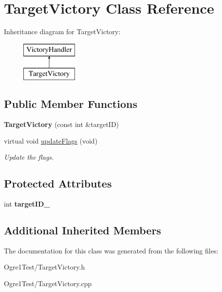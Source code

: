 \hypertarget{class_target_victory}{}\section{Target\+Victory Class Reference}
\label{class_target_victory}
Inheritance diagram for Target\+Victory\+:\begin{figure}[H]
\begin{center}
\leavevmode
\includegraphics[height=2.000000cm]{class_target_victory}
\end{center}
\end{figure}
\subsection*{Public Member Functions}
\begin{DoxyCompactItemize}
\item 
{\bfseries Target\+Victory} (const int \&target\+ID)\hypertarget{class_target_victory_a649c1ee1de19cbea7bd56e64e6c47124}{}\label{class_target_victory_a649c1ee1de19cbea7bd56e64e6c47124}

\item 
virtual void \hyperlink{class_target_victory_a5c497ae3a6a46591b3ef4d13f9d30659}{update\+Flags} (void)\hypertarget{class_target_victory_a5c497ae3a6a46591b3ef4d13f9d30659}{}\label{class_target_victory_a5c497ae3a6a46591b3ef4d13f9d30659}

\begin{DoxyCompactList}\small\item\em Update the flags. \end{DoxyCompactList}\end{DoxyCompactItemize}
\subsection*{Protected Attributes}
\begin{DoxyCompactItemize}
\item 
int {\bfseries target\+I\+D\+\_\+}\hypertarget{class_target_victory_ab603bc0b67a63385cdc5ee0860c549cf}{}\label{class_target_victory_ab603bc0b67a63385cdc5ee0860c549cf}

\end{DoxyCompactItemize}
\subsection*{Additional Inherited Members}


The documentation for this class was generated from the following files\+:\begin{DoxyCompactItemize}
\item 
Ogre1\+Test/Target\+Victory.\+h\item 
Ogre1\+Test/Target\+Victory.\+cpp\end{DoxyCompactItemize}
